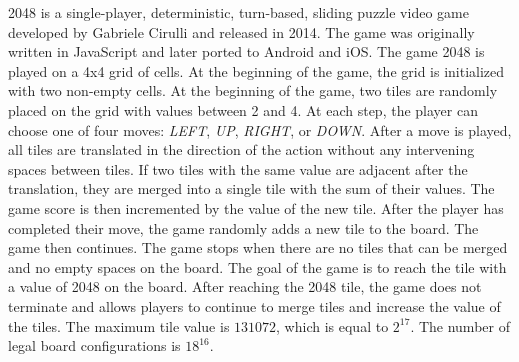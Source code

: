 2048\cite{2048} is a single-player, deterministic, turn-based, sliding puzzle video game developed by Gabriele Cirulli and released in 2014. The game was originally written in JavaScript and later ported to Android and iOS.
The game 2048 is played on a 4x4 grid of cells. At the beginning of the game, the grid is initialized with two non-empty cells. At the beginning of the game, two tiles are randomly placed on the grid with values between 2 and 4. At each step, the player can choose one of four moves: \textit{LEFT}, \textit{UP}, \textit{RIGHT}, or \textit{DOWN}. After a move is played, all tiles are translated in the direction of the action without any intervening spaces between tiles. If two tiles with the same value are adjacent after the translation, they are merged into a single tile with the sum of their values. The game score is then incremented by the value of the new tile.
After the player has completed their move, the game randomly adds a new tile to the board. The game then continues. The game stops when there are no tiles that can be merged and no empty spaces on the board.
The goal of the game is to reach the tile with a value of 2048 on the board. After reaching the 2048 tile, the game does not terminate and allows players to continue to merge tiles and increase the value of the tiles. The maximum tile value is $131072$, which is equal to $2^{17}$. The number of legal board configurations is $18^{16}$.
